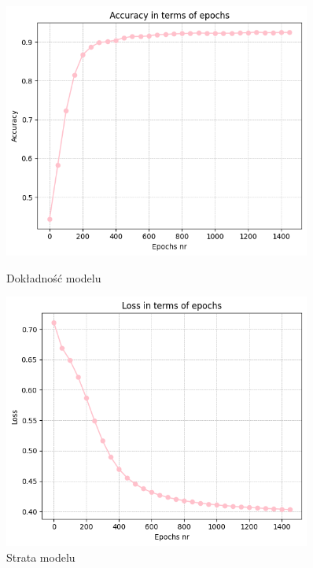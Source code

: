 \documentclass[polish,12pt,a4paper]{extarticle}
\begin{document}
\begin{figure}[h!]
    \centering
    \begin{minipage}[b]{0.48\textwidth}
    \includegraphics[width=0.9\textwidth]{img/neural_accuracy.png}
    \caption{Dokładność modelu}
    \end{minipage}
     \hspace{0.02\textwidth}
    \begin{minipage}[b]{0.48\textwidth}
    \includegraphics[width=0.9\textwidth]{img/neural_loss.png}
    \caption{Strata modelu}
    \end{minipage}
\end{figure}
\FloatBarrier
\end{document}

